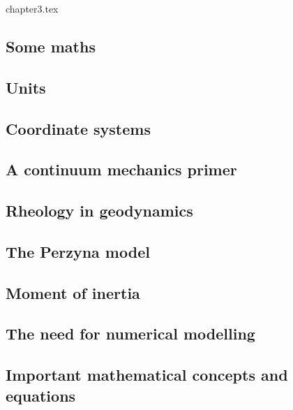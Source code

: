 \begin{flushright} {\tiny {\color{gray} chapter3.tex}} \end{flushright}

\subsection{Some maths} 
\subsection{Units}  %
\subsection{Coordinate systems}  \label{ss:coordsys} %
\subsection{A continuum mechanics primer} %
\newpage
\subsection{Rheology in geodynamics}  %


\newpage
\subsection{The Perzyna model}\label{sec:perzyna}


\newpage
\subsection{Moment of inertia}  %
\subsection{The need for numerical modelling} %
\newpage
\subsection{Important mathematical concepts and equations}  \label{ss:maths} %
